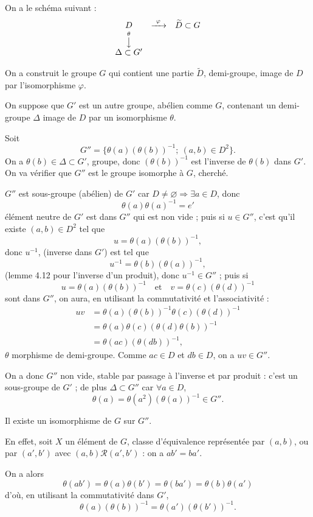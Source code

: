 On a le schéma suivant :
\[
\begin{array}{ccc}
D & \xrightarrow{\ \varphi\ } & \widetilde D\subset G\\
\mathop{\big\downarrow}\limits^{\theta} & & \\
\Delta\subset G' & &
\end{array}
\]

On a construit le groupe $G$ qui contient une partie $\widetilde D$, demi-groupe, image de $D$ par l'isomorphisme $\varphi$.

On suppose que $G'$ est un autre groupe, abélien comme $G$, contenant un demi-groupe $\Delta$ image de $D$ par un isomorphisme $\theta$.

Soit
\[
G''=\{\theta(a)(\theta(b))^{-1};\ (a,b)\in D^2\}.
\]
On a $\theta(b)\in\Delta\subset G'$, groupe, donc $(\theta(b))^{-1}$ est l'inverse de $\theta(b)$ dans $G'$. On va vérifier que $G''$ est le groupe isomorphe à $G$, cherché.

$G''$ est sous-groupe (abélien) de $G'$ car $D\ne\varnothing\Rightarrow\exists a\in D$, donc
\[
\theta(a)\theta(a)^{-1}=e'
\]
élément neutre de $G'$ est dans $G''$ qui est non vide ; puis si $u\in G''$, c'est qu'il existe $(a,b)\in D^2$ tel que
\[
u=\theta(a)(\theta(b))^{-1},
\]
donc $u^{-1}$, (inverse dans $G'$) est tel que
\[
u^{-1}=\theta(b)(\theta(a))^{-1},
\]
(lemme 4.12 pour l'inverse d'un produit), donc $u^{-1}\in G''$ ; puis si
\[
u=\theta(a)(\theta(b))^{-1}
\quad\text{et}\quad
v=\theta(c)(\theta(d))^{-1}
\]
sont dans $G''$, on aura, en utilisant la commutativité et l'associativité :
\begin{align*}
uv
&=\theta(a)(\theta(b))^{-1}\theta(c)(\theta(d))^{-1}\\
&=\theta(a)\theta(c)(\theta(d)\theta(b))^{-1}\\
&=\theta(ac)(\theta(db))^{-1},
\end{align*}
$\theta$ morphisme de demi-groupe. Comme $ac\in D$ et $db\in D$, on a $uv\in G''$.

On a donc $G''$ non vide, stable par passage à l'inverse et par produit : c'est un sous-groupe de $G'$ ; de plus $\Delta\subset G''$ car $\forall a\in D$,
\[
\theta(a)=\theta(a^2)(\theta(a))^{-1}\in G''.
\]

Il existe un isomorphisme de $G$ sur $G''$.

En effet, soit $X$ un élément de $G$, classe d'équivalence représentée par $(a,b)$, ou par $(a',b')$ avec $(a,b)\mathcal R(a',b')$ : on a $ab'=ba'$.

On a alors
\[
\theta(ab')=\theta(a)\theta(b')=\theta(ba')=\theta(b)\theta(a')
\]
d'où, en utilisant la commutativité dans $G'$,
\[
\theta(a)(\theta(b))^{-1}=\theta(a')(\theta(b'))^{-1}.
\]

